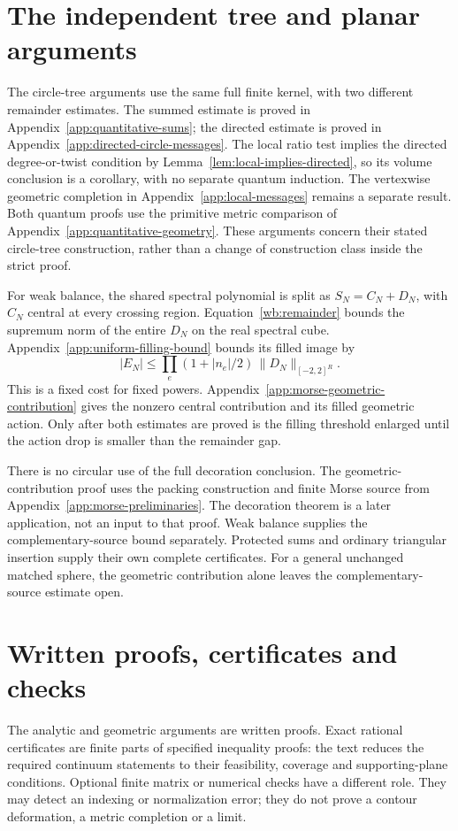 \section{The independent tree and planar arguments}

The circle-tree arguments use the same full finite kernel, with two
different remainder estimates. The summed estimate is proved in
Appendix~\ref{app:quantitative-sums}; the directed estimate is proved
in Appendix~\ref{app:directed-circle-messages}. The local ratio test
implies the directed degree-or-twist condition by
Lemma~\ref{lem:local-implies-directed}, so its volume conclusion is
a corollary, with no separate quantum induction. The vertexwise
geometric completion in Appendix~\ref{app:local-messages} remains
a separate result. Both quantum proofs use the primitive metric
comparison of Appendix~\ref{app:quantitative-geometry}. These
arguments concern their stated circle-tree construction, rather
than a change of construction class inside the strict proof.

For weak balance, the shared spectral polynomial is split as
$S_N=C_N+D_N$, with $C_N$ central at every crossing region.
Equation~\eqref{wb:remainder} bounds the supremum norm of the entire
$D_N$ on the real spectral cube.
Appendix~\ref{app:uniform-filling-bound} bounds its filled image by
\[
 |E_N|\le\prod_e(1+|n_e|/2)\,\|D_N\|_{[-2,2]^R}.
\]
This is a fixed cost for fixed powers.
Appendix~\ref{app:morse-geometric-contribution} gives the nonzero
central contribution and its filled geometric action. Only after
both estimates are proved is the filling threshold enlarged until
the action drop is smaller than the remainder gap.

There is no circular use of the full decoration conclusion.
The geometric-contribution proof uses the packing construction
and finite Morse source from
Appendix~\ref{app:morse-preliminaries}. The decoration theorem is a
later application, not an input to that proof. Weak balance supplies the complementary-source
bound separately. Protected sums and ordinary triangular insertion
supply their own complete certificates. For a general unchanged
matched sphere, the geometric contribution alone leaves the
complementary-source estimate open.

\section{Written proofs, certificates and checks}

The analytic and geometric arguments are written proofs. Exact
rational certificates are finite parts of specified inequality
proofs: the text reduces the required continuum statements to their
feasibility, coverage and supporting-plane conditions. Optional
finite matrix or numerical checks have a different role. They may
detect an indexing or normalization error; they do not prove a
contour deformation, a metric completion or a limit.

